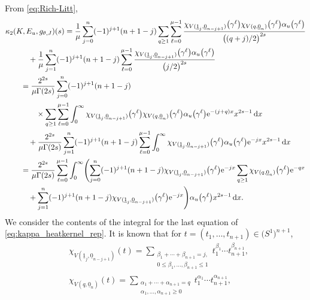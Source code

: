\documentclass[10pt,a4paper]{amsart}
\numberwithin{equation}{section}
\begin{document}
From \eqref{eq:Rich-Litt},
\begin{align}
 & \kappa_{2} (K, E_{u} , g_{\theta , J} ) (s)
 =
 \frac{1}{\mu}
 \sum_{j=0}^{n}
 (-1 )^{j+1} (n+1-j)
 \sum_{q \geq 1 }
 \sum_{\ell = 0}^{\mu -1}
 \frac{
 \chi_{V ( \underline{1}_{j} ,\underline{0}_{n-j+1} )} \big( \gamma^{\ell} \big)
 \chi_{V ( q, \underline{0}_{n} )} \big( \gamma^{\ell} \big)
 \alpha_u \big( \gamma^{\ell} \big)
 }{
 \bigl( (q+j)/2 \bigr)^{2s}
 }
 \notag
 \\
 & \qquad\quad{}
 +
 \frac{1}{\mu}
 \sum_{j=1}^{n}
 (-1 )^{j+1} (n+1-j)
 \sum_{\ell = 0}^{\mu -1}
 \frac{
 \chi_{V ( \underline{1}_{j} ,\underline{0}_{n-j+1} )} \big( \gamma^{\ell} \big)
 \alpha_u \big( \gamma^{\ell} \big)
 }{
 \bigl( j/2 \bigr)^{2s}
 }
 \notag
 \\
 & \qquad{}=
 \frac{
 2^{2s}
 }{
 \mu \Gamma (2s)
 }
 \sum_{j=0}^{n}
 (-1 )^{j+1} (n+1-j)
 \notag
 \\
 & \qquad\quad\quad{}\times
 \sum_{q \geq 1 }
 \sum_{\ell = 0}^{\mu -1}
 \int_{0}^{\infty}
 \chi_{V ( \underline{1}_{j} ,\underline{0}_{n-j+1} )} \big( \gamma^{\ell} \big)
 \chi_{V ( q, \underline{0}_{n} )} \big( \gamma^{\ell} \big)
 \alpha_u \big( \gamma^{\ell} \big)
 {\rm e}^{-(j + q) x }
 x^{2s-1}
 \, {\rm d}x
 \notag
 \\
 & \qquad\quad{}
 +
 \frac{
 2^{2s}
 }{
 \mu \Gamma (2s)
 }
 \sum_{j=1}^{n}
 (-1 )^{j+1} (n+1-j)
 \sum_{\ell = 0}^{\mu-1}
 \int_0^{\infty}
 \chi_{V ( \underline{1}_{j} ,\underline{0}_{n-j+1} )} \big( \gamma^{\ell} \big)
 \alpha_u \big( \gamma^{\ell} \big)
 {\rm e}^{-jx}
 x^{2s-1} \, {\rm d}x
 \notag
 \\
 & \qquad{}=
 \frac{
 2^{2s}
 }{
 \mu \Gamma (2s)
 }
 \sum_{\ell = 0}^{\mu-1}
 \int_{0}^{\infty}
 \Biggl(
 \sum_{j=0}^{n}
 (-1 )^{j+1} (n+1-j)
 \chi_{V ( \underline{1}_{j} ,\underline{0}_{n-j+1} )} \big( \gamma^{\ell} \big)
 {\rm e}^{-j x }
 \sum_{q \geq 1 }
 \chi_{V ( q, \underline{0}_{n} )} \big( \gamma^{\ell} \big)
 {\rm e}^{-q x }
 \notag \\
 & \qquad\quad{}
 +
 \sum_{j=1}^{n}
 (-1 )^{j+1} (n+1-j)
 \chi_{V ( \underline{1}_{j} ,\underline{0}_{n-j+1} )} \big( \gamma^{\ell} \big)
 {\rm e}^{-jx}
 \Biggr)
 \alpha_u \big( \gamma^{\ell} \big)
 x^{2s-1} \, {\rm d}x
 \label{eq:kappa_heatkernel_rep}
 .
\end{align}
We consider the contents of the integral for the last equation of \eqref{eq:kappa_heatkernel_rep}.
It is known that for $t = (t_1 , \dots , t_{n+1} ) \in \big(S^1\big)^{n+1}$,
\begin{align}
& \chi_{V ( \underline{1}_{j} ,\underline{0}_{n-j+1} )} ( t )
 =
 \sum_{\substack{\beta_1 + \cdots + \beta_{n+1} = j , \\
 0 \leq \beta_1 , \ldots , \beta_{n+1} \leq 1}}
 t_{1}^{\beta_1} \cdots t_{n+1}^{\beta_{n+1}}
 \label{eq:chi_j}
 ,
 \\
& \chi_{V ( q, \underline{0}_{n} )} ( t )
 =
 \sum_{\substack{ \alpha_1 + \cdots + \alpha_{n+1} = q\\
 \alpha_1 , \ldots , \alpha_{n+1} \geq 0}}
 t_{1}^{\alpha_1} \cdots t_{n+1}^{\alpha_{n+1}}
 \label{eq:chi_q}
 ,
\end{align}
\end{document}
